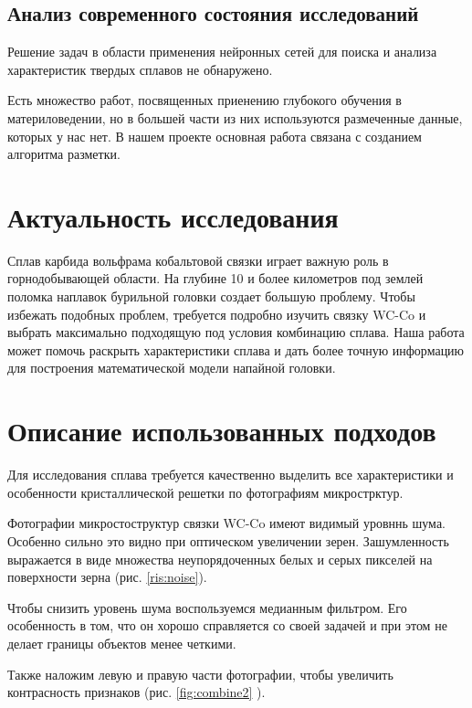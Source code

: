 \documentclass[a4paper, 14pt]{article}
\begin{document}
	\subsection{Анализ современного состояния исследований}
	
	Решение задач в области применения нейронных сетей для поиска и анализа характеристик твердых сплавов не обнаружено. 
	
	Есть множество работ, посвященных приенению глубокого обучения в материловедении, но в большей части из них используются размеченные данные, которых у нас нет. В нашем проекте основная работа связана с созданием алгоритма разметки. 
	
	\section{Актуальность исследования }
	
	Сплав карбида вольфрама кобальтовой связки играет важную роль в горнодобывающей области. На глубине 10 и более километров под землей поломка наплавок бурильной головки создает большую проблему. Чтобы избежать подобных проблем, требуется подробно изучить связку WC-Co и выбрать максимально подходящую под условия комбинацию сплава. Наша работа может помочь раскрыть характеристики сплава и дать более точную информацию для построения математической модели напайной головки.

	\section{Описание использованных подходов }
	Для исследования сплава требуется качественно выделить все характеристики и особенности 
	кристаллической решетки по фотографиям микрострктур. 
	
	Фотографии микростоструктур связки WC-Co имеют видимый уровннь шума. Особенно сильно 
	это видно при оптическом увеличении зерен. Зашумленность выражается в виде 
	множества неупорядоченных белых и серых пикселей на поверхности зерна (рис. \ref{ris:noise}). 
	
	Чтобы снизить уровень шума воспользуемся медианным фильтром. Его особенность в том, что он хорошо справляется со своей задачей и при этом не делает границы объектов менее четкими. 
	
	Также наложим левую и правую части фотографии, чтобы увеличить контрасность признаков (рис. \ref{fig:combine2} ).
	
\end{document}

